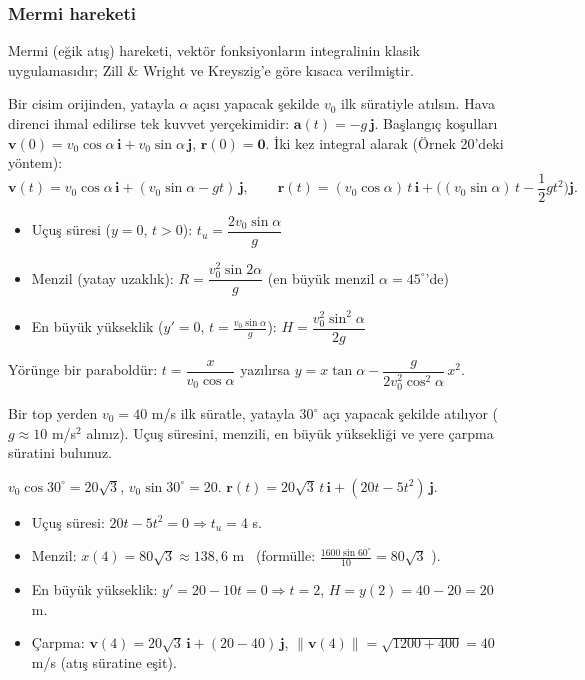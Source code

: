 \subsubsection{Mermi hareketi}

\begin{bilgi}
Mermi (eğik atış) hareketi, vektör fonksiyonların integralinin klasik uygulamasıdır; Zill \& Wright ve Kreyszig'e göre kısaca verilmiştir.
\end{bilgi}

Bir cisim orijinden, yatayla $\alpha$ açısı yapacak şekilde $v_0$ ilk süratiyle atılsın. Hava direnci ihmal edilirse tek kuvvet
yerçekimidir: $\mathbf a(t)=-g\,\mathbf j$. Başlangıç koşulları $\mathbf v(0)=v_0\cos\alpha\,\mathbf i+v_0\sin\alpha\,\mathbf j$,
$\mathbf r(0)=\mathbf 0$. İki kez integral alarak (Örnek 20'deki yöntem):
\[ \mathbf v(t)=v_0\cos\alpha\,\mathbf i+(v_0\sin\alpha-gt)\,\mathbf j,\qquad
\mathbf r(t)=(v_0\cos\alpha)\,t\,\mathbf i+\Big((v_0\sin\alpha)\,t-\frac12gt^2\Big)\mathbf j . \]

\begin{teorem}
\begin{itemize}
\item Uçuş süresi ($y=0$, $t>0$): $t_u=\dfrac{2v_0\sin\alpha}{g}$
\item Menzil (yatay uzaklık): $R=\dfrac{v_0^2\sin2\alpha}{g}$ \quad (en büyük menzil $\alpha=45^\circ$'de)
\item En büyük yükseklik ($y'=0$, $t=\frac{v_0\sin\alpha}{g}$): $H=\dfrac{v_0^2\sin^2\alpha}{2g}$
\end{itemize}
Yörünge bir paraboldür: $t=\dfrac{x}{v_0\cos\alpha}$ yazılırsa $y=x\tan\alpha-\dfrac{g}{2v_0^2\cos^2\alpha}\,x^2$.
\end{teorem}

\begin{soru}
Bir top yerden $v_0=40$ m/s ilk süratle, yatayla $30^\circ$ açı yapacak şekilde atılıyor ($g\approx10$ m/s$^2$ alınız).
Uçuş süresini, menzili, en büyük yüksekliği ve yere çarpma süratini bulunuz.
\end{soru}
\begin{cevap}
$v_0\cos30^\circ=20\sqrt3$, $v_0\sin30^\circ=20$. $\mathbf r(t)=20\sqrt3\,t\,\mathbf i+(20t-5t^2)\,\mathbf j$.
\begin{itemize}
\item Uçuş süresi: $20t-5t^2=0\Rightarrow t_u=4$ s.
\item Menzil: $x(4)=80\sqrt3\approx138{,}6$ m \ (formülle: $\frac{1600\sin60^\circ}{10}=80\sqrt3$ \checkmark).
\item En büyük yükseklik: $y'=20-10t=0\Rightarrow t=2$, $H=y(2)=40-20=20$ m.
\item Çarpma: $\mathbf v(4)=20\sqrt3\,\mathbf i+(20-40)\,\mathbf j$, $\|\mathbf v(4)\|=\sqrt{1200+400}=40$ m/s (atış süratine eşit).
\end{itemize}
\end{cevap}


